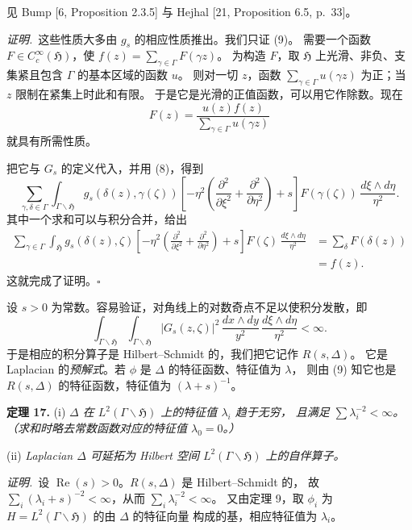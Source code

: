 \smallskip
见 Bump [6, Proposition 2.3.5] 与 Hejhal [21, Proposition 6.5, p.\ 33]。

\smallskip
\noindent\emph{证明.}\ 这些性质大多由 $g_{s}$ 的相应性质推出。我们只证 (9)。
需要一个函数 $F\in C_{c}^{\infty}(\mathfrak{H})$，使 $f(z)=\sum_{\gamma\in\Gamma}F(\gamma z)$。
为构造 $F$，取 $\mathfrak{H}$ 上光滑、非负、支集紧且包含 $\Gamma$ 的基本区域的函数 $u$。
则对一切 $z$，函数 $\sum_{\gamma\in\Gamma}u(\gamma z)$ 为正；当 $z$ 限制在紧集上时此和有限。
于是它是光滑的正值函数，可以用它作除数。现在
\[
F(z)=\frac{u(z)f(z)}{\sum_{\gamma\in\Gamma}u(\gamma z)}
\]
就具有所需性质。

把它与 $G_{s}$ 的定义代入，并用 (8)，得到
\[
\sum_{\gamma,\delta\in\Gamma}\int_{\Gamma\backslash\mathfrak{H}}g_{s}(\delta(z),\gamma(\zeta))
\left[-\eta^{2}\left(\frac{\partial^{2}}{\partial\xi^{2}}+\frac{\partial^{2}}{\partial\eta^{2}}\right)+s\right]
F(\gamma(\zeta))\,\frac{d\xi\wedge d\eta}{\eta^{2}} .
\]
其中一个求和可以与积分合并，给出
\[
\begin{aligned}
\sum_{\gamma\in\Gamma}\int_{\mathfrak{H}}g_{s}(\delta(z),\zeta)
\left[-\eta^{2}\left(\frac{\partial^{2}}{\partial\xi^{2}}+\frac{\partial^{2}}{\partial\eta^{2}}\right)+s\right]
F(\zeta)\,\frac{d\xi\wedge d\eta}{\eta^{2}}
&=\sum_{\delta}F(\delta(z))\\
&=f(z).
\end{aligned}
\]
这就完成了证明。\hfill$\square$

设 $s>0$ 为常数。容易验证，对角线上的对数奇点不足以使积分发散，即
\[
\int_{\Gamma\backslash\mathfrak{H}}\int_{\Gamma\backslash\mathfrak{H}}|G_{s}(z,\zeta)|^{2}
\,\frac{dx\wedge dy}{y^{2}}\,\frac{d\xi\wedge d\eta}{\eta^{2}}<\infty .
\]
于是相应的积分算子是 Hilbert--Schmidt 的，我们把它记作 $R(s,\Delta)$。
它是 Laplacian 的\emph{预解式}。若 $\phi$ 是 $\Delta$ 的特征函数、特征值为 $\lambda$，
则由 (9) 知它也是 $R(s,\Delta)$ 的特征函数，特征值为 $(\lambda+s)^{-1}$。

\par\medskip\noindent\textbf{定理 17.}\quad
(i) \emph{$\Delta$ 在 $L^{2}(\Gamma\backslash\mathfrak{H})$ 上的特征值 $\lambda_{i}$ 趋于无穷，
且满足 $\sum\lambda_{i}^{-2}<\infty$。（求和时略去常数函数对应的特征值 $\lambda_{0}=0$。）}

(ii) \emph{Laplacian $\Delta$ 可延拓为 Hilbert 空间 $L^{2}(\Gamma\backslash\mathfrak{H})$ 上的自伴算子。}

\smallskip
\noindent\emph{证明.}\ 设 $\operatorname{Re}(s)>0$。$R(s,\Delta)$ 是 Hilbert--Schmidt 的，
故 $\sum_{i}(\lambda_{i}+s)^{-2}<\infty$，从而 $\sum_{i}\lambda_{i}^{-2}<\infty$。
又由定理 9，取 $\phi_{i}$ 为 $H=L^{2}(\Gamma\backslash\mathfrak{H})$ 的由 $\Delta$ 的特征向量
构成的基，相应特征值为 $\lambda_{i}$。

